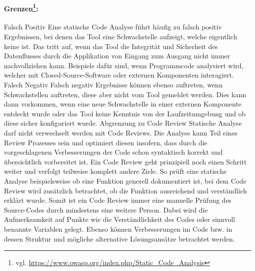 \paragraph{Grenzen\footnote{vgl. \url{https://www.owasp.org/index.php/Static_Code_Analysis}}:} 
Falsch Positiv
Eine statische Code Analyse führt häufig zu falsch positiv Ergebnissen, bei denen das Tool eine Schwachstelle aufzeigt, welche eigentlich keine ist. Das tritt auf, wenn das Tool die Integrität und Sicherheit des Datenflusses durch die Applikation von Eingang zum Ausgang nicht immer nachvollziehen kann. Beispiele dafür sind, wenn Programmcode analysiert wird, welcher mit Closed-Source-Software oder externen Komponenten interagiert. 
Falsch Negativ
Falsch negativ Ergebnisse können ebenso auftreten, wenn Schwachstellen auftreten, diese aber nicht vom Tool gemeldet werden. Dies kann dann vorkommen, wenn eine neue Schwachstelle in einer externen Komponente entdeckt wurde oder das Tool keine Kenntnis von der Laufzeitumgebung und ob diese sicher konfiguriert wurde.
Abgrenzung zu Code Review
Statische Analyse darf nicht verwechselt werden mit Code Reviews. Die Analyse kann Teil eines Review Prozesses sein und optimiert diesen insofern, dass durch die vorgeschlagenen Verbesserungen der Code schon syntaktisch korrekt und übersichtlich vorbereitet ist. 
Ein Code Review geht prinzipiell noch einen Schritt weiter und verfolgt teilweise komplett andere Ziele. So prüft eine statische Analyse beispielsweise ob eine Funktion generell dokumentiert ist, bei dem Code Review wird zusätzlich betrachtet, ob die Funktion ausreichend und verständlich erklärt wurde.
Somit ist ein Code Review immer eine manuelle Prüfung des Source-Codes durch mindestens eine weitere Person. Dabei wird die Aufmerksamkeit auf Punkte wie die Verständlichkeit des Codes oder sinnvoll benannte Variablen gelegt. Ebenso können Verbesserungen im Code bzw. in dessen Struktur und mögliche alternative Lösungsansätze betrachtet werden.
